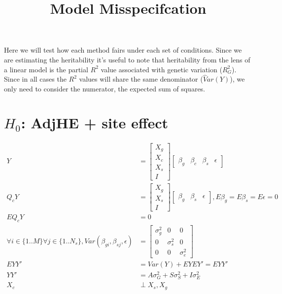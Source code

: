 \documentclass{article}
\title{Model Misspecifcation}
\begin{document}
Here we will test how each method fairs under each set of conditions. Since we are estimating the heritability it's useful to note that heritability from the lens of a linear model is the partial $R^2$ value associated with genetic variation ($R^2_G$). Since in all cases the $R^2$ values will share the same denominator ($\hat Var(Y)$), we only need to consider the numerator, the expected sum of squares.


\section{$H_0$: AdjHE + site effect}
\begin{align*}
	Y & =  \begin{bmatrix} X_g \\ X_c \\ X_s \\ I \end{bmatrix} \begin{bmatrix}
	\beta_g & \beta_c & \beta_s & \epsilon 
\end{bmatrix}	 \\
	Q_cY & =  \begin{bmatrix} X_g \\ X_s \\ I \end{bmatrix} \begin{bmatrix}
	\beta_g & \beta_s & \epsilon 
\end{bmatrix}, E\beta_g = E\beta_s = E\epsilon = 0 \\
	EQ_cY & = 0  \tag{First Moment}	 \\
	\forall i \in \{1..M\} \forall j \in \{1..N_s\}, Var(\beta_{gi}, \beta_{sj}, \epsilon) & = \begin{bmatrix}
	\sigma_g^2 & 0 & 0 \\
	0 & \sigma_s^2 & 0 \\
	0 & 0 & \sigma_e^2 
	\end{bmatrix}\\
	EYY' & = Var(Y) + EYEY' = EYY' \tag{Second Moment} \\
	YY' & = A\sigma_G^2 + S\sigma_S^2 + I \sigma_E^2 \tag{Regression Equation}\\
	X_c & \perp X_s, X_g 
\end{align*}
\end{document}
